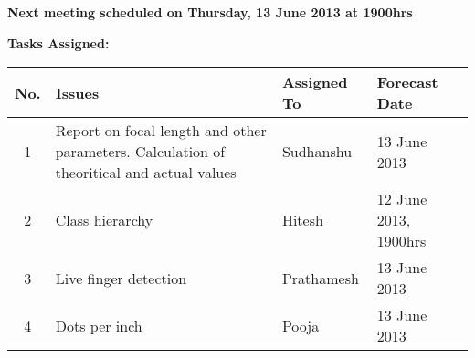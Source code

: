 \documentclass[a4paper,12pt]{article}
\begin{document}
\vskip20pt
\textbf{Next meeting scheduled on Thursday, 13 June 2013 at 1900hrs}

\vskip20pt
\textbf{Tasks Assigned:}
\vskip10pt
\begin{tabular}{|c|p{6cm}|p{3cm}|p{4cm}|}
 \hline
 \hline
 \textbf{No.} & \textbf{Issues} & \textbf{Assigned To} & \textbf{Forecast Date} \\
  \hline
1 & Report on focal length and other parameters. Calculation of theoritical and actual values & Sudhanshu & 13 June 2013 \\
  \hline
2 & Class hierarchy & Hitesh & 12 June 2013, 1900hrs \\
  \hline
3 & Live finger detection & Prathamesh & 13 June 2013 \\
  \hline
4 & Dots per inch & Pooja & 13 June 2013 \\
  \hline
\end{tabular}
\end{document}
